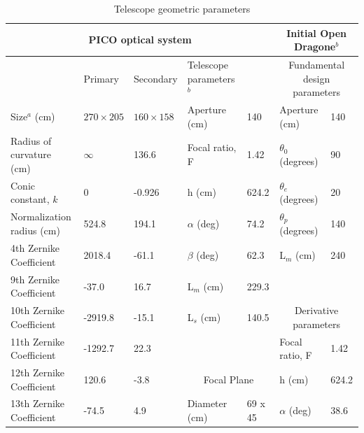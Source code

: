 \documentclass[]{spie}  %
\begin{document}
\begin{table}[ht]
\centering
\caption{Telescope geometric parameters  \label{tab:optics}}
\hspace{-1cm}
\begin{adjustbox}{width=1.1\textwidth}
\begin{tabular}{|l|llll||ll|}
\hline
\multicolumn{5}{|c||}{PICO optical system}                                    & \multicolumn{2}{c|}{Initial Open Dragone$^b$}     \\ \hline
                          & Primary           & Secondary         & Telescope parameters$^b$   &         & \multicolumn{2}{c|}{Fundamental design parameters}  \\
Size$^a$ (cm)                 & $270 \times 205$ & $160 \times 158$ & Aperture (cm)           & 140      & Aperture (cm)                  & 140   \\
Radius of curvature (cm)  & $\infty$         & 136.6             & Focal ratio, F             & 1.42     & $\theta_0$ (degrees)           & 90    \\
Conic constant, $k$       & 0                 & -0.926            & h (cm)                    & 624.2    & $\theta_e$ (degrees)           & 20    \\
Normalization radius (cm) & 524.8             & 194.1             & $\alpha$ (deg)            & 74.2     & $\theta_p$ (degrees)           & 140   \\
4th Zernike Coefficient   & 2018.4            & -61.1             & $\beta$  (deg)            &  62.3    & L$_m$ (cm)                     & 240   \\
9th Zernike Coefficient   & -37.0             & 16.7              & L$_m$ (cm)                &   229.3  &                                &         \\
10th Zernike Coefficient  & -2919.8           & -15.1             & L$_s$ (cm)                &   140.5  & \multicolumn{2}{c|}{Derivative parameters} \\ 
11th Zernike Coefficient  & -1292.7           & 22.3              &                           &          & Focal ratio, F                 & 1.42  \\   
12th Zernike Coefficient  & 120.6             & -3.8              &   \multicolumn{2}{c||}{Focal Plane}  & h (cm)                         & 624.2 \\   
13th Zernike Coefficient  & -74.5             & 4.9               & Diameter (cm)             & 69 x 45  & $\alpha$ (deg)                 & 38.6  \\   

\end{tabular}
\end{adjustbox}
\end{table}
\end{document}
